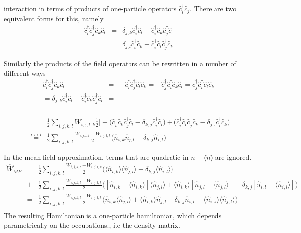 \documentclass[11pt,a4paper]{report}
\begin{document}
interaction in terms of products of one-particle operators
$\hat{c}^\dagger_i\hat{c}_j$. There are two equivalent forms for this, namely
\begin{eqnarray}
\hat{c}^\dagger_i\hat{c}^\dagger_j\hat{c}_k\hat{c}_l
&=&\delta_{j,k}\hat{c}^\dagger_i\hat{c}_l
-\hat{c}^\dagger_i\hat{c}_k\hat{c}^\dagger_j\hat{c}_l 
\nonumber\\
&=&\delta_{j,l}\hat{c}^\dagger_i\hat{c}_k
-\hat{c}^\dagger_i\hat{c}_l\hat{c}^\dagger_j\hat{c}_k 
\end{eqnarray}





Similarly the products of the field operators can be rewritten in a
number of different ways
\begin{eqnarray}
\hat{c}^\dagger_i\hat{c}^\dagger_j\hat{c}_k\hat{c}_l
&=&-\hat{c}^\dagger_i\hat{c}^\dagger_j\hat{c}_l\hat{c}_k
=-\hat{c}^\dagger_j\hat{c}^\dagger_i\hat{c}_k\hat{c}_l
=\hat{c}^\dagger_j\hat{c}^\dagger_i\hat{c}_l\hat{c}_k
\nonumber\\
=\delta_{j,k}\hat{c}^\dagger_i\hat{c}_l
-\hat{c}^\dagger_i\hat{c}_k\hat{c}^\dagger_j\hat{c}_l &=&
\end{eqnarray}



\begin{eqnarray}
\nonumber\\
&=&
\frac{1}{2}\sum_{i,j,k,l}W_{i,j,l,k} 
\frac{1}{2}\biggl[-\biggl(
\hat{c}^\dagger_i\hat{c}_k\hat{c}^\dagger_j\hat{c}_l
-\delta_{k,j}\hat{c}^\dagger_i\hat{c}_l\biggr)
+\biggl(
\hat{c}^\dagger_i\hat{c}_l\hat{c}^\dagger_j\hat{c}_k
-\delta_{j,l}\hat{c}^\dagger_i\hat{c}_k\biggr)\biggr]
\nonumber\\
&\stackrel{i\leftrightarrow l}{=}&
\frac{1}{2}\sum_{i,j,k,l}\frac{W_{i,j,k,l}-W_{i,j,l,k}}{2} 
\biggl(\hat{n}_{i,k}\hat{n}_{j,l}-\delta_{k,j}\hat{n}_{i,l}\biggr)
\end{eqnarray}

In the mean-field approximation, terms that are quadratic in
$\hat{n}-\langle\hat{n}\rangle$ are ignored.
\begin{eqnarray}
\hat{W}_{MF}&=&
\frac{1}{2}\sum_{i,j,k,l}\frac{W_{i,j,k,l}-W_{i,j,l,k}}{2} 
\biggl(\langle\hat{n}_{i,k}\rangle\langle\hat{n}_{j,l}\rangle-\delta_{k,j}
\langle\hat{n}_{i,l}\rangle\biggr)
\nonumber\\
&+&
\frac{1}{2}\sum_{i,j,k,l}\frac{W_{i,j,k,l}-W_{i,j,l,k}}{2} 
\biggl([\hat{n}_{i,k}-\langle\hat{n}_{i,k}\rangle]\langle\hat{n}_{j,l}\rangle
+\langle\hat{n}_{i,k}\rangle[\hat{n}_{j,l}-\langle\hat{n}_{j,l}\rangle]
-\delta_{k,j}[\hat{n}_{i,l}-\langle\hat{n}_{i,l}\rangle]\biggr)
\nonumber\\
&=&
\frac{1}{2}\sum_{i,j,k,l}\frac{W_{i,j,k,l}-W_{i,j,l,k}}{2} 
\biggl(\hat{n}_{i,k}\langle\hat{n}_{j,l}\rangle
+\langle\hat{n}_{i,k}\rangle\hat{n}_{j,l}
-\delta_{k,j}\hat{n}_{i,l}
-\langle\hat{n}_{i,k}\rangle\langle\hat{n}_{j,l}\rangle\biggr)
\nonumber\\
\end{eqnarray}
The resulting Hamiltonian is a one-particle hamiltonian, which depends
parametrically on the occupations., i.e the density matrix.
\end{document}

